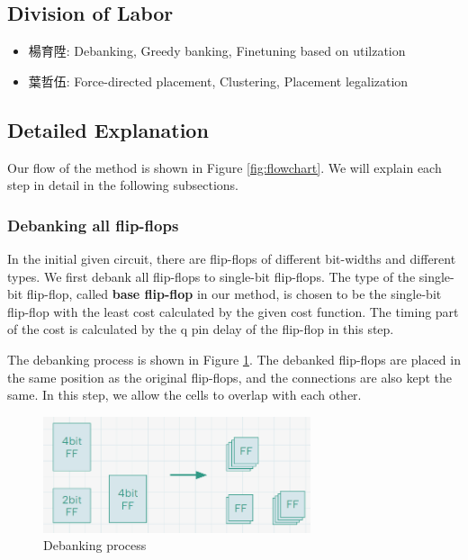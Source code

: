 \documentclass[12pt]{article}
\begin{document}
\subsection{Division of Labor}
\begin{itemize}
    \item 楊育陞: Debanking, Greedy banking, Finetuning based on utilzation
    \item 葉哲伍: Force-directed placement, Clustering, Placement legalization
\end{itemize}

\subsection{Detailed Explanation}

Our flow of the method is shown in Figure \ref{fig:flowchart}. We will explain each step in detail in the following subsections.

\subsubsection{Debanking all flip-flops}
In the initial given circuit, there are flip-flops of different bit-widths and different types. We first debank all flip-flops to single-bit flip-flops. The type of the single-bit flip-flop, called \textbf{base flip-flop} in our method, is chosen to be the single-bit flip-flop with the least cost calculated by the given cost function. The timing part of the cost is calculated by the q pin delay of the flip-flop in this step.

The debanking process is shown in Figure \ref{fig:debanking}. The debanked flip-flops are placed in the same position as the original flip-flops, and the connections are also kept the same. In this step, we allow the cells to overlap with each other.

\begin{figure}[htbp]
    \centering
    \includegraphics[width=0.7\textwidth]{debank.png}
    \caption{Debanking process}
    \label{fig:debanking}
\end{figure}
\end{document}
